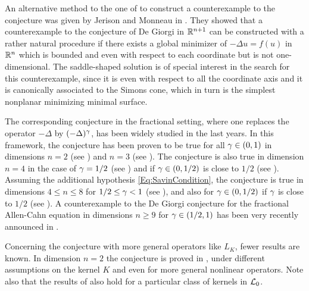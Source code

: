 An alternative method to the one of \cite{delPinoKowalczykWei} to construct a counterexample to the conjecture was given by Jerison and Monneau in \cite{JerisonMonneau}. They showed that a counterexample to the conjecture of De Giorgi in $\mathbb{R}^{n+1}$ can be constructed with a rather natural procedure if there exists a global minimizer of $-\Delta u = f(u)$ in $\mathbb{R}^n$ which is bounded and even with respect to each coordinate but is not one-dimensional. The saddle-shaped solution is of special interest in the search for this counterexample, since it is even with respect to all the coordinate axis and it is canonically associated to the Simons cone, which in turn is the simplest nonplanar minimizing minimal surface.




The corresponding conjecture in the fractional setting, where one replaces the operator $-\Delta$ by $(-\Delta)^\gamma$, has been widely studied in the last years. In this framework, the conjecture has been proven to be true for all $\gamma\in(0,1)$ in dimensions $n=2$ (see \cite{CabreSolaMorales,CabreSireI,SireValdinoci}) and $n=3$ (see \cite{CabreCinti-EnergyHalfL, CabreCinti-SharpEnergy,DipierroFarinaValdinoci}). The conjecture is also true in dimension $n=4$ in the case of $\gamma = 1/2$ (see \cite{FigalliSerra}) and if $\gamma\in(0,1/2)$ is close to $1/2$ (see \cite{CabreCintiSerra-Stable}). Assuming the additional hypothesis \eqref{Eq:SavinCondition}, the conjecture is true in dimensions $4\leq n \leq 8$ for $1/2 \leq \gamma < 1$ (see \cite{Savin-Fractional,Savin-Fractional2}), and also for $\gamma\in(0,1/2)$ if $\gamma$ is close to $1/2$ (see \cite{DipierroSerraValdinoci}). A counterexample to the De Giorgi conjecture for the fractional Allen-Cahn equation in dimensions $n \geq 9$ for $\gamma \in (1/2,1)$ has been very recently announced in \cite{ChanLiuWei}.

Concerning the conjecture with more general operators like $L_K$, fewer results are known. In dimension $n=2$ the conjecture is proved in \cite{HamelRosOtonSireValdinoci, Bucur, FazlySire}, under different assumptions on the kernel $K$ and even for more general nonlinear operators. Note also that the results of \cite{DipierroSerraValdinoci} also hold for a particular class of kernels in $\mathcal{L}_0$.





